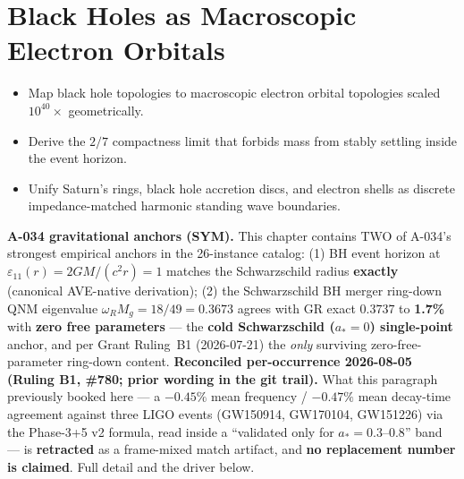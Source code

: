 \chapter{Black Holes as Macroscopic Electron Orbitals}
\label{ch:bh_orbitals}


\begin{objectivebox}
\begin{itemize}
    \item Map black hole topologies to macroscopic electron orbital topologies scaled $10^{40}\times$ geometrically.
    \item Derive the $2/7$ compactness limit that forbids mass from stably settling inside the event horizon.
    \item Unify Saturn's rings, black hole accretion discs, and electron shells as discrete impedance-matched harmonic standing wave boundaries.
\end{itemize}
\end{objectivebox}

\textbf{A-034 gravitational anchors (SYM).} This chapter contains
TWO of A-034's strongest empirical anchors in the 26-instance catalog:
(1) BH event horizon at $\varepsilon_{11}(r) = 2GM/(c^2 r) = 1$ matches
the Schwarzschild radius \textbf{exactly} (canonical AVE-native derivation);
(2) the Schwarzschild BH merger ring-down QNM eigenvalue
$\omega_R M_g = 18/49 = 0.3673$ agrees with GR exact $0.3737$ to
\textbf{1.7\%} with \textbf{zero free parameters} --- the \textbf{cold
Schwarzschild ($a_* = 0$) single-point} anchor, and per Grant Ruling~B1
(2026-07-21) the \emph{only} surviving zero-free-parameter ring-down content.
\textbf{Reconciled per-occurrence 2026-08-05 (Ruling B1, \#780; prior wording
in the git trail).} What this paragraph previously booked here --- a
$-0.45\%$ mean frequency / $-0.47\%$ mean decay-time agreement against three
LIGO events (GW150914, GW170104, GW151226) via the Phase-3+5 v2 formula, read
inside a ``validated only for $a_* = 0.3$--$0.8$'' band --- is
\textbf{retracted} as a frame-mixed match artifact, and \textbf{no
replacement number is claimed}. Full detail and the driver
 below.

